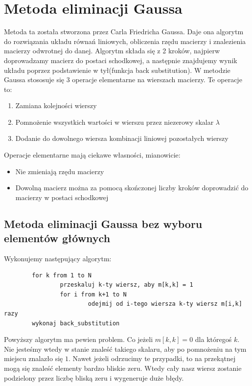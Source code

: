 \documentclass[a4paper,10pt]{article}
\begin{document}
\section{Metoda eliminacji Gaussa}
Metoda ta została stworzona przez Carla Friedricha Gaussa. Daje ona algorytm do rozwiązania układu równań liniowych,
obliczenia rzędu macierzy i znalezienia macierzy odwrotnej do danej. Algorytm składa się z 2 kroków, najpierw doprowadzamy
macierz do postaci schodkowej, a następnie znajdujemy wynik układu poprzez podstawienie w tył(funkcja back substitution).
W metodzie Gaussa stososuje się 3 operacje elementarne na wierszach macierzy. Te operacje to:
\begin{enumerate}
	\item Zamiana kolejności wierszy
	\item Pomnożenie wszystkich wartości w wierszu przez niezerowy skalar $\lambda$
	\item Dodanie do dowolnego wiersza kombinacji liniowej pozostałych wierszy
\end{enumerate}
Operacje elementarne mają ciekawe własności, mianowicie:
\begin{itemize}
	\item Nie zmieniają rzędu macierzy
	\item Dowolną macierz można za pomocą skończonej liczby kroków doprowadzić do macierzy w postaci schodkowej
\end{itemize}
\subsection{Metoda eliminacji Gaussa bez wyboru elementów głównych}
Wykonujemy następujący algorytm:
\begin{verbatim}
        for k from 1 to N
                przeskaluj k-ty wiersz, aby m[k,k] = 1
                for i from k+1 to N
                        odejmij od i-tego wiersza k-ty wiersz m[i,k] razy
        wykonaj back_substitution
\end{verbatim}
Powyższy algorytm ma pewien problem. Co jeżeli $m[k,k] = 0$ dla któregoś $k$. Nie jesteśmy wtedy w stanie
znaleść takiego skalaru, aby po pomnożeniu na tym miejscu znalazło się $1$. Nawet jeżeli odrzucimy te przypadki,
to na przekątnej mogą się znaleść elementy bardzo bliskie zeru. Wtedy cały nasz wiersz zostanie podzielony przez
liczbę bliską zeru i wygeneruje duże błędy.
\end{document}
